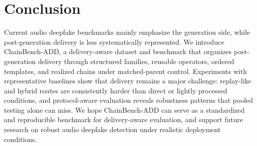 \section{Conclusion}
\label{sec:conclusion}

Current audio deepfake benchmarks mainly emphasize the generation side, while post-generation delivery is less systematically represented. We introduce ChainBench-ADD, a delivery-aware dataset and benchmark that organizes post-generation delivery through structured families, reusable operators, ordered templates, and realized chains under matched-parent control. Experiments with representative baselines show that delivery remains a major challenge: replay-like and hybrid routes are consistently harder than direct or lightly processed conditions, and protocol-aware evaluation reveals robustness patterns that pooled testing alone can miss. We hope ChainBench-ADD can serve as a standardized and reproducible benchmark for delivery-aware evaluation, and support future research on robust audio deepfake detection under realistic deployment conditions.